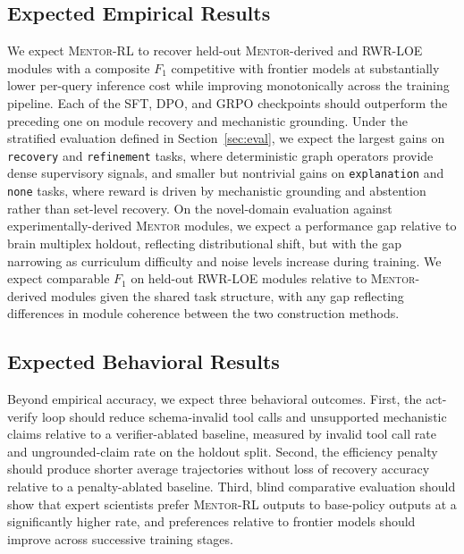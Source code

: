 \documentclass[thesis,letterpaper,12pt]{utthesis}
\begin{document}
\subsection{Expected Empirical Results}
We expect \textsc{Mentor-RL} to recover held-out \textsc{Mentor}-derived and RWR-LOE modules with a composite $F_1$ competitive with frontier models at substantially lower per-query inference cost while improving monotonically across the training pipeline. Each of the SFT, DPO, and GRPO checkpoints should outperform the preceding one on module recovery and mechanistic grounding. Under the stratified evaluation defined in Section~\ref{sec:eval}, we expect the largest gains on \texttt{recovery} and \texttt{refinement} tasks, where deterministic graph operators provide dense supervisory signals, and smaller but nontrivial gains on \texttt{explanation} and \texttt{none} tasks, where reward is driven by mechanistic grounding and abstention rather than set-level recovery. On the novel-domain evaluation against experimentally-derived \textsc{Mentor} modules, we expect a performance gap relative to brain multiplex holdout, reflecting distributional shift, but with the gap narrowing as curriculum difficulty and noise levels increase during training. We expect comparable $F_1$ on held-out RWR-LOE modules relative to \textsc{Mentor}-derived modules given the shared task structure, with any gap reflecting differences in module coherence between the two construction methods.

\subsection{Expected Behavioral Results}
Beyond empirical accuracy, we expect three behavioral outcomes. First, the act-verify loop should reduce schema-invalid tool calls and unsupported mechanistic claims relative to a verifier-ablated baseline, measured by invalid tool call rate and ungrounded-claim rate on the holdout split. Second, the efficiency penalty should produce shorter average trajectories without loss of recovery accuracy relative to a penalty-ablated baseline. Third, blind comparative evaluation should show that expert scientists prefer \textsc{Mentor-RL} outputs to base-policy outputs at a significantly higher rate, and preferences relative to frontier models should improve across successive training stages.
\end{document}

